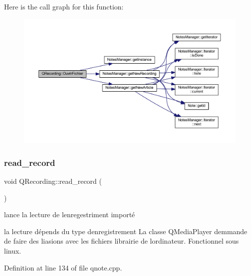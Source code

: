 Here is the call graph for this function\+:\nopagebreak
\begin{figure}[H]
\begin{center}
\leavevmode
\includegraphics[width=350pt]{class_q_recording_a9eaf976da6c3c768d15a5e53f3982753_cgraph}
\end{center}
\end{figure}
\mbox{\label{class_q_recording_a5c5c221fed1648c1813da1f195e26663}} 
\subsubsection{\texorpdfstring{read\+\_\+record}{read\_record}}
{\footnotesize\ttfamily void Q\+Recording\+::read\+\_\+record (\begin{DoxyParamCaption}{ }\end{DoxyParamCaption})\hspace{0.3cm}{\ttfamily [slot]}}



lance la lecture de l\textquotesingle{}enregestriment importé 

la lecture dépends du type d\textquotesingle{}enregistrement La classe Q\+Media\+Player demmande de faire des liasions avec les fichiers librairie de l\textquotesingle{}ordinateur. Fonctionnel sous linux. 

Definition at line 134 of file qnote.\+cpp.

\mbox{\label{class_q_recording_a98fa21d8814450c0d912c8ce102ca832}} 
